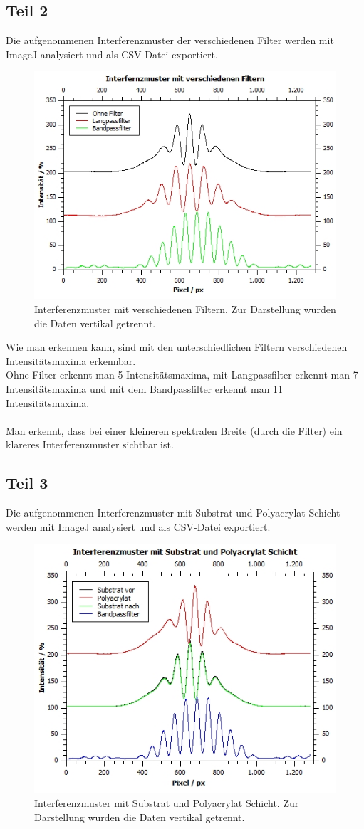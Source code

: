 \documentclass[12pt,a4paper,twoside]{article}
\begin{document}
\subsection{Teil 2}
Die aufgenommenen Interferenzmuster der verschiedenen Filter werden mit ImageJ analysiert und als CSV-Datei exportiert. 

\begin{figure}[H]
    \centering
    \includegraphics[width=0.6\linewidth]{nudes/aufgabe 2 plot.jpg}
    \caption{Interferenzmuster mit verschiedenen Filtern. Zur Darstellung wurden die Daten vertikal getrennt.}
    \label{fig:aufgabe 2 kontrast}
\end{figure}

\noindent
Wie man erkennen kann, sind mit den unterschiedlichen Filtern verschiedenen Intensitätsmaxima erkennbar. 
\\
Ohne Filter erkennt man 5 Intensitätsmaxima, mit Langpassfilter erkennt man 7 Intensitätsmaxima und mit dem Bandpassfilter erkennt man 11 Intensitätsmaxima. 
\\
\\
Man erkennt, dass bei einer kleineren spektralen Breite (durch die Filter) ein klareres Interferenzmuster sichtbar ist. 

\subsection{Teil 3}
Die aufgenommenen Interferenzmuster mit Substrat und Polyacrylat Schicht werden mit ImageJ analysiert und als CSV-Datei exportiert. 

\begin{figure}[H]
    \centering
    \includegraphics[width=0.6\linewidth]{nudes/aufgabe 3 plot.jpg}
    \caption{Interferenzmuster mit Substrat und Polyacrylat Schicht. Zur Darstellung wurden die Daten vertikal getrennt.}
    \label{fig:aufgabe 3 Interferenzmuster}
\end{figure}
\end{document}
